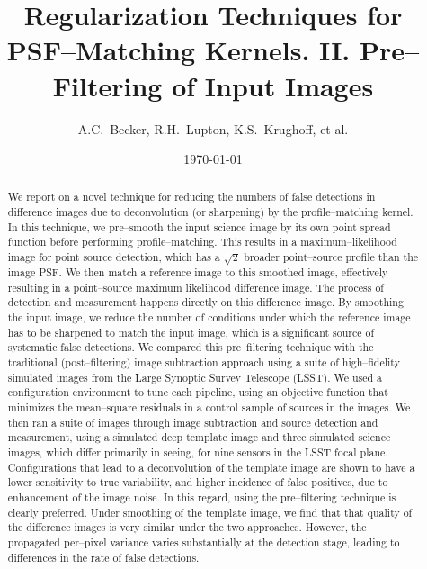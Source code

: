 \documentclass[floatfix, apj]{emulateapj}
\begin{document}
\title{Regularization Techniques for PSF--Matching Kernels. II. Pre--Filtering of Input Images}

\author{
A.C.~Becker,
R.H.~Lupton,
K.S.~Krughoff,
et al.
}

\date{\today}

\begin{abstract}

We report on a novel technique for reducing the numbers of false detections in difference images due to deconvolution (or sharpening) by the profile--matching kernel.
In this technique, we pre--smooth the input science image by its own point spread function before performing profile--matching.
This results in a maximum--likelihood image for point source detection, which has a $\sqrt{2}$ broader point--source profile than the image PSF.
We then match a reference image to this smoothed image, effectively resulting in a point--source maximum likelihood difference image.
The process of detection and measurement happens directly on this difference image.
By smoothing the input image, we reduce the number of conditions under which the reference image has to be sharpened to match the input image, which is a significant source of systematic false detections.
We compared this pre--filtering technique with the traditional (post--filtering) image subtraction approach using a suite of high--fidelity simulated images from the Large Synoptic Survey Telescope (LSST).
We used a configuration environment to tune each pipeline, using an objective function that minimizes the mean--square residuals in a control sample of sources in the images.
We then ran a suite of images through image subtraction and source detection and measurement, using a simulated deep template image and three simulated science images, which differ primarily in seeing, for nine sensors in the LSST focal plane.
Configurations that lead to a deconvolution of the template image are shown to have a lower sensitivity to true variability, and higher incidence of false positives, due to enhancement of the image noise.
In this regard, using the pre--filtering technique is clearly preferred.
Under smoothing of the template image, we find that that quality of the difference images is very similar under the two approaches.
However, the propagated per--pixel variance varies substantially at the detection stage, leading to differences in the rate of false detections.

\end{abstract}
\end{document}
